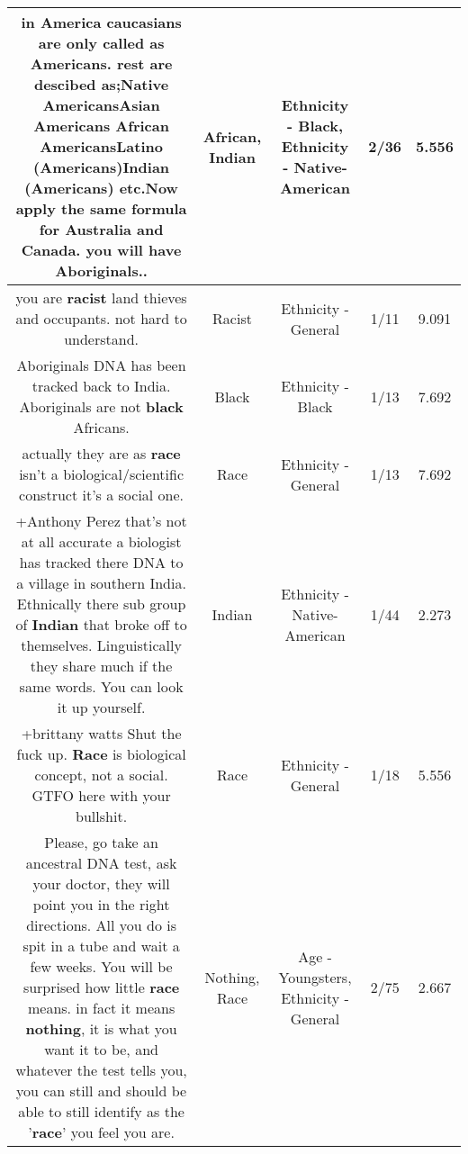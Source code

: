 \documentclass[11pt]{article}
\newlength\mylength
\begin{document}
\begin{center}
\begin{longtable}{|C{.65\mylength}|C{.30\mylength}|C{.12\mylength}|C{.12\mylength}|C{.12\mylength}|}
  \small in America caucasians are only called as Americans. rest are descibed as;Native AmericansAsian Americans \textbf{African} AmericansLatino (Americans)\textbf{Indian} (Americans) etc.Now apply the same formula for Australia and Canada. you will have Aboriginals..\normalsize   & African, Indian & Ethnicity - Black, Ethnicity - Native-American & 2/36 & 5.556 \\  \hline
  \small you are \textbf{racist} land thieves and occupants. not hard to understand.\normalsize   & Racist & Ethnicity - General & 1/11 & 9.091 \\  \hline
  \small Aboriginals DNA has been tracked back to India. Aboriginals are not \textbf{black} Africans.\normalsize   & Black & Ethnicity - Black & 1/13 & 7.692 \\  \hline
  \small actually they are as \textbf{race} isn't a biological/scientific construct it's a social one.\normalsize   & Race & Ethnicity - General & 1/13 & 7.692 \\  \hline
  \small +Anthony Perez that's not at all accurate a biologist has tracked there DNA to a village in southern India. Ethnically there sub group of \textbf{Indian} that broke off to themselves. Linguistically they share much if the same words. You can look it up yourself.\normalsize   & Indian & Ethnicity - Native-American & 1/44 & 2.273 \\  \hline
  \small +brittany watts Shut the fuck up. \textbf{Race} is biological concept, not a  social. GTFO here with your bullshit.\normalsize   & Race & Ethnicity - General & 1/18 & 5.556 \\  \hline
  \small Please, go take an ancestral DNA test, ask your doctor, they will point you in the right directions. All you do is spit in a tube and wait a few weeks. You will be surprised how little \textbf{race} means. in fact it means \textbf{nothing}, it is what you want it to be, and whatever the test tells you, you can still and should be able to still identify as the '\textbf{race}' you feel you are.\normalsize   & Nothing, Race & Age - Youngsters, Ethnicity - General & 2/75 & 2.667 \\  \hline

\end{longtable}
\end{center}
\end{document}
